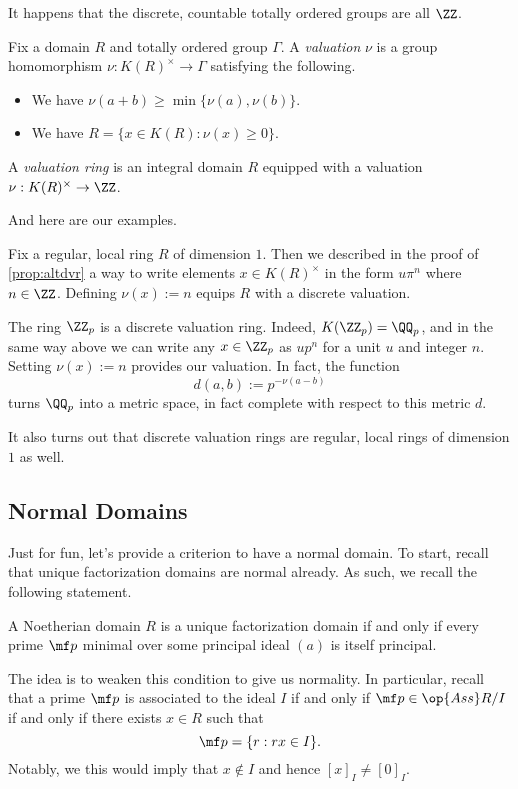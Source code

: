 It happens that the discrete, countable totally ordered groups are all $\ZZ$.
\begin{definition}[Valuation]
	Fix a domain $R$ and totally ordered group $\Gamma$. A \textit{valuation} $\nu$ is a group homomorphism $\nu:K(R)^\times\to\Gamma$ satisfying the following.
	\begin{itemize}
		\item We have $\nu(a+b)\ge\min\{\nu(a),\nu(b)\}$.
		\item We have $R=\{x\in K(R):\nu(x)\ge0\}$.
	\end{itemize}
\end{definition}
\begin{definition}
	A \textit{valuation ring} is an integral domain $R$ equipped with a valuation $\nu:K(R)^\times\to\ZZ$.
\end{definition}
And here are our examples.
\begin{example}
	Fix a regular, local ring $R$ of dimension $1$. Then we described in the proof of \autoref{prop:altdvr} a way to write elements $x\in K(R)^\times$ in the form $u\pi^n$ where $n\in\ZZ$. Defining $\nu(x):=n$ equips $R$ with a discrete valuation.
\end{example}
\begin{example}
	The ring $\ZZ_p$ is a discrete valuation ring. Indeed, $K(\ZZ_p)=\QQ_p$, and in the same way above we can write any $x\in\ZZ_p$ as $up^n$ for a unit $u$ and integer $n$. Setting $\nu(x):=n$ provides our valuation. In fact, the function
	\[d(a,b):=p^{-\nu(a-b)}\]
	turns $\QQ_p$ into a metric space, in fact complete with respect to this metric $d$.
\end{example}
\begin{remark}[Nir]
	It also turns out that discrete valuation rings are regular, local rings of dimension $1$ as well.
\end{remark}

\subsection{Normal Domains}
Just for fun, let's provide a criterion to have a normal domain. To start, recall that unique factorization domains are normal already. As such, we recall the following statement.
\begin{prop}
	A Noetherian domain $R$ is a unique factorization domain if and only if every prime $\mf p$ minimal over some principal ideal $(a)$ is itself principal.
\end{prop}
The idea is to weaken this condition to give us normality. In particular, recall that a prime $\mf p$ is associated to the ideal $I$ if and only if $\mf p\in\op{Ass}R/I$ if and only if there exists $x\in R$ such that
\[\mf p=\{r:rx\in I\}.\]
Notably, we this would imply that $x\notin I$ and hence $[x]_I\ne[0]_I$.

